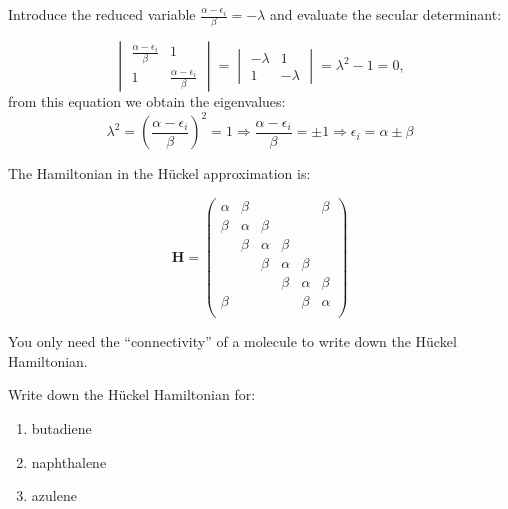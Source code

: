 \documentclass[../Main/chem532-notes.tex]{subfiles}
\begin{document}
\begin{example}[Ethylene]
Introduce the reduced variable $\frac{\alpha - \epsilon_i}{\beta} = - \lambda$ and evaluate the secular determinant:

\begin{equation}
\begin{vmatrix}
\frac{\alpha - \epsilon_i}{\beta} & 1 \\
1 & \frac{\alpha - \epsilon_i}{\beta}
\end{vmatrix}
= \begin{vmatrix}
-\lambda & 1 \\
1 & -\lambda
\end{vmatrix}
= \lambda^2 - 1 = 0,
\end{equation}
from this equation we obtain the eigenvalues:
\begin{equation}
\lambda^2 = \left(\frac{\alpha - \epsilon_i}{\beta}\right)^2 = 1
\Rightarrow
\frac{\alpha - \epsilon_i}{\beta} = \pm 1
\Rightarrow
\epsilon_i = \alpha \pm \beta
\end{equation}
\end{example}

\begin{example}[Benzene]
The Hamiltonian in the H\"{u}ckel approximation is:

\begin{equation}
\mathbf{H}
=
\begin{pmatrix}
\alpha & \beta & & & & \beta\\
\beta & \alpha & \beta & & & \\
& \beta & \alpha & \beta & & \\
& & \beta & \alpha & \beta & \\
& & & \beta & \alpha & \beta \\
\beta  & & & & \beta & \alpha \\
\end{pmatrix}
\end{equation}
\end{example}

You only need the ``connectivity'' of a molecule to write down the H\"{u}ckel Hamiltonian.

\begin{problem}
Write down the H\"{u}ckel Hamiltonian for:
\begin{enumerate}
\item butadiene
\item naphthalene
\item azulene
\end{enumerate}
\end{problem}
\end{document}
